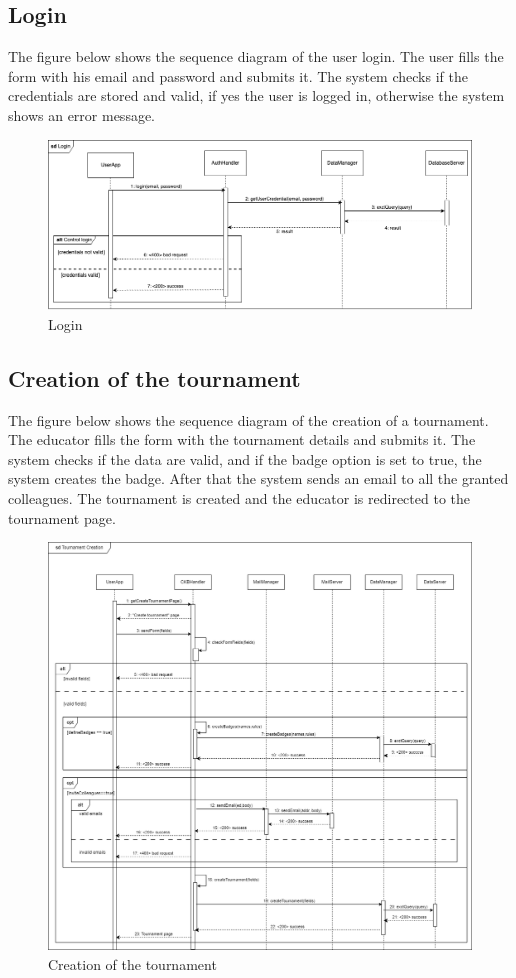\subsection{Login}
The figure below shows the sequence diagram of the user login. The user fills the form with his email and password and submits it. 
The system checks if the credentials are stored and valid, if yes the user is logged in, otherwise the system shows an error message.
\begin{figure}[H]
    \centering
    \includegraphics[width=1\textwidth]{images/seq_diagrams/Login_DD.png}
    \caption{Login}
\end{figure}

\subsection{Creation of the tournament}
The figure below shows the sequence diagram of the creation of a tournament. The educator fills the form
 with the tournament details and submits it. The system checks if the data are valid, and if the badge option is set to true, the system creates the badge.
 After that the system sends an email to all the granted colleagues. The tournament is created and the educator is redirected to the tournament page.

 \begin{figure}[H]
    \centering
    \includegraphics[width=1\textwidth]{images/seq_diagrams/tournament_creation_DD.png}
    \caption{Creation of the tournament}
\end{figure}

